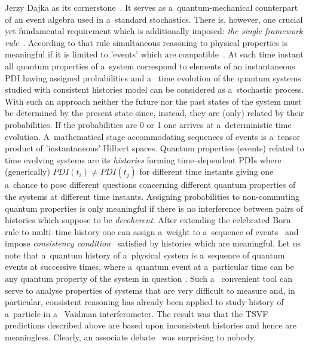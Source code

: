 \begin{artengenv}{Jerzy Dajka}
as its cornerstone~\parencite{Griffiths}. It   serves as a~quantum-mechanical counterpart of an event algebra used in a~standard stochastics. There is, however, one  crucial yet fundamental requirement which is additionally imposed: {\it the single framework rule}~\parencite{Griffiths,Griffiths_reason,GRIFFITHS_measur}. According to that rule  simultaneous reasoning to physical properties is meaningful if it is limited to  'events'  which are compatible~\parencite{Griffiths,Griffiths_reason,GRIFFITHS_measur,GRIFFITHS_onto}. 
At each time instant all  quantum properties of a~system correspond to elements of an instantaneous PDI having assigned probabilities and a~ time  evolution  of the quantum systems studied with consistent histories model can be considered as a~stochastic process. With such an approach neither 
the future nor the past states of the system must be 
determined by the present state since,  instead, they are (only) related by their probabilities. If the probabilities are 0 or 1 one arrives at a~deterministic time evolution. A~mathematical stage accommodating  sequences of events is a~tensor product of 'instantaneous' Hilbert spaces. 
%
Quantum properties (events) related to time evolving systems are its {\it histories} forming time--dependent PDIs 
where (generically) $PDI(t_i)\neq PDI(t_j)$ for different time instants giving one a~chance to pose different questions concerning different quantum properties of the systems at different time instants. 
Assigning probabilities to non-commuting quantum properties  is only meaningful if there is
no interference between pairs of histories which suppose to be {\it decoherent}. 
After extending the celebrated Born rule to multi--time history  one can assign a~weight to a~sequence of events~\parencite{Griffiths1984,Griffiths,Griffiths_reason,GRIFFITHS_onto, GRIFFITHS_measur} and impose  {\it consistency condition}~\parencite{Griffiths1984,Griffiths,Griffiths_reason,GRIFFITHS_onto, GRIFFITHS_measur} satisfied by histories which are meaningful.
Let us note that a~quantum history of a~physical system is a~sequence of quantum events at successive times, where a~quantum event at a~particular time can be any quantum property of the system in question \parencite{Griffiths}. Such a~ convenient tool can  serve to analyse properties of systems that are very difficult to measure and, in particular, consistent reasoning has already been applied to study history of a~particle in a~ Vaidman interferometer. The result was that the TSVF predictions described above are based upon inconsistent histories and hence are meaningless.  Clearly, an associate debate~\parencite{PhysRevA.94.032115,PhysRevA.95.066101} was surprising to nobody.

\end{artengenv}
